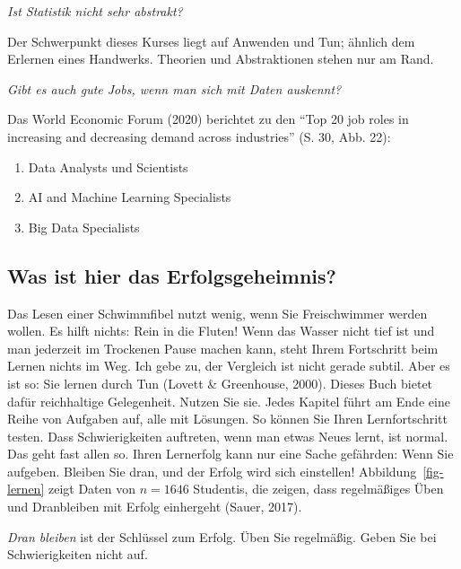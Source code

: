 \documentclass[
  letterpaper,
  twoside,
  open=any]{scrbook}
\providecommand{\tightlist}{%
  \setlength{\itemsep}{0pt}\setlength{\parskip}{0pt}}\usepackage{longtable,booktabs,array}
\theoremstyle{definition}
\theoremstyle{definition}
\theoremstyle{definition}
\theoremstyle{remark}
\begin{document}
\emph{Ist Statistik nicht sehr abstrakt?}

Der Schwerpunkt dieses Kurses liegt auf Anwenden und Tun; ähnlich dem
Erlernen eines Handwerks. Theorien und Abstraktionen stehen nur am Rand.

\emph{Gibt es auch gute Jobs, wenn man sich mit Daten auskennt?}

Das World Economic Forum (2020) berichtet zu den \enquote{Top 20 job
roles in increasing and decreasing demand across industries} (S. 30,
Abb. 22):

\begin{enumerate}
\def\labelenumi{\arabic{enumi}.}
\tightlist
\item
  Data Analysts und Scientists
\item
  AI and Machine Learning Specialists
\item
  Big Data Specialists
\end{enumerate}

\subsection{Was ist hier das
Erfolgsgeheimnis?}\label{was-ist-hier-das-erfolgsgeheimnis}

Das Lesen einer Schwimmfibel nutzt wenig, wenn Sie Freischwimmer werden
wollen. Es hilft nichts: Rein in die Fluten! Wenn das Wasser nicht tief
ist und man jederzeit im Trockenen Pause machen kann, steht Ihrem
Fortschritt beim Lernen nichts im Weg. Ich gebe zu, der Vergleich ist
nicht gerade subtil. Aber es ist so: Sie lernen durch Tun (Lovett \&
Greenhouse, 2000). Dieses Buch bietet dafür reichhaltige Gelegenheit.
Nutzen Sie sie. Jedes Kapitel führt am Ende eine Reihe von Aufgaben auf,
alle mit Lösungen. So können Sie Ihren Lernfortschritt testen. Dass
Schwierigkeiten auftreten, wenn man etwas Neues lernt, ist normal. Das
geht fast allen so. Ihren Lernerfolg kann nur eine Sache gefährden: Wenn
Sie aufgeben. Bleiben Sie dran, und der Erfolg wird sich einstellen!
Abbildung~\ref{fig-lernen} zeigt Daten von \(n=1646\) Studentis, die
zeigen, dass regelmäßiges Üben und Dranbleiben mit Erfolg einhergeht
(Sauer, 2017).

\emph{Dran bleiben} ist der Schlüssel zum Erfolg. Üben Sie regelmäßig.
Geben Sie bei Schwierigkeiten nicht auf. 
  
\end{document}
